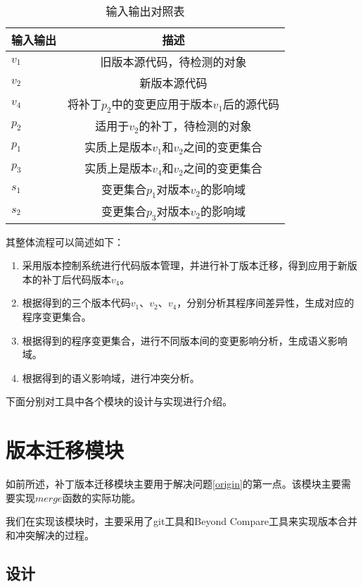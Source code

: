 \begin{table}[H]
	\caption{输入输出对照表}
	\label{all_io2}
	\centering
	\begin{tabular}{lc}
		\toprule[1.5pt]
		{\heiti 输入输出} & {\heiti 描述}\\\midrule[1pt]
		$v_1$ & 旧版本源代码，待检测的对象 \\
		$v_2$ & 新版本源代码 \\
		$v_4$ & 将补丁$p_2$中的变更应用于版本$v_1$后的源代码 \\
		$p_2$ & 适用于$v_2$的补丁，待检测的对象 \\
		$p_1$ & 实质上是版本$v_1$和$v_2$之间的变更集合\\
		$p_3$ & 实质上是版本$v_4$和$v_2$之间的变更集合\\
		$s_1$ & 变更集合$p_1$对版本$v_2$的影响域 \\
		$s_2$ & 变更集合$p_3$对版本$v_2$的影响域 \\
		\bottomrule[1.5pt]
	\end{tabular}
\end{table}

其整体流程可以简述如下：

\begin{enumerate}
	\item 采用版本控制系统进行代码版本管理，并进行补丁版本迁移，得到应用于新版本的补丁后代码版本$v_4$。
	\item 根据得到的三个版本代码$v_1$、$v_2$、$v_4$，分别分析其程序间差异性，生成对应的程序变更集合。
	\item 根据得到的程序变更集合，进行不同版本间的变更影响分析，生成语义影响域。
	\item 根据得到的语义影响域，进行冲突分析。
\end{enumerate}

下面分别对工具中各个模块的设计与实现进行介绍。

\section{版本迁移模块}
\label {tool_patch}

如前所述，补丁版本迁移模块主要用于解决问题\ref {origin}的第一点。该模块主要需要实现$merge$函数的实际功能。

我们在实现该模块时，主要采用了git工具和Beyond Compare工具来实现版本合并和冲突解决的过程。

\subsection{设计}


